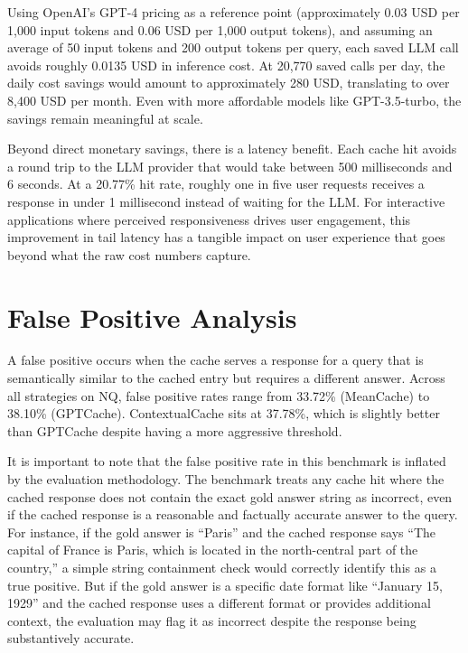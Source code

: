 \documentclass[12pt,a4paper]{report}
\begin{document}
Using OpenAI's GPT-4 pricing as a reference point (approximately 0.03 USD per 1,000 input tokens and 0.06 USD per 1,000 output tokens), and assuming an average of 50 input tokens and 200 output tokens per query, each saved LLM call avoids roughly 0.0135 USD in inference cost. At 20,770 saved calls per day, the daily cost savings would amount to approximately 280 USD, translating to over 8,400 USD per month. Even with more affordable models like GPT-3.5-turbo, the savings remain meaningful at scale.

Beyond direct monetary savings, there is a latency benefit. Each cache hit avoids a round trip to the LLM provider that would take between 500 milliseconds and 6 seconds. At a 20.77\% hit rate, roughly one in five user requests receives a response in under 1 millisecond instead of waiting for the LLM. For interactive applications where perceived responsiveness drives user engagement, this improvement in tail latency has a tangible impact on user experience that goes beyond what the raw cost numbers capture.

\section{False Positive Analysis}

A false positive occurs when the cache serves a response for a query that is semantically similar to the cached entry but requires a different answer. Across all strategies on NQ, false positive rates range from 33.72\% (MeanCache) to 38.10\% (GPTCache). ContextualCache sits at 37.78\%, which is slightly better than GPTCache despite having a more aggressive threshold.

It is important to note that the false positive rate in this benchmark is inflated by the evaluation methodology. The benchmark treats any cache hit where the cached response does not contain the exact gold answer string as incorrect, even if the cached response is a reasonable and factually accurate answer to the query. For instance, if the gold answer is ``Paris'' and the cached response says ``The capital of France is Paris, which is located in the north-central part of the country,'' a simple string containment check would correctly identify this as a true positive. But if the gold answer is a specific date format like ``January 15, 1929'' and the cached response uses a different format or provides additional context, the evaluation may flag it as incorrect despite the response being substantively accurate.
\end{document}
